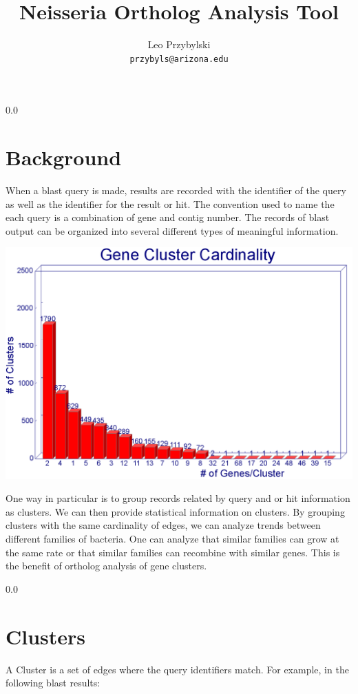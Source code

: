 \documentclass[11pt,notitlepage]{article}
\title{Neisseria Ortholog Analysis Tool}
\author{Leo Przybylski\\
\texttt{przybyls@arizona.edu}}
\begin{document}
  \maketitle
  \tableofcontents

  \abstract{\ldots
}
  {\setlength{\baselineskip}%
           {0.0\baselineskip}
  \section*{\hfill Background}
  \hrulefill \par}
  When a blast query is made, results are recorded with the identifier of the query
  as well as the identifier for the result or hit. The convention used to name the
  each query is a combination of gene and contig number. The records of blast output
  can be organized into several different types of meaningful information.



  \includegraphics[width=145mm]{i90_a90_graph.png}


  One way in particular is to group records related by query and or hit information as
  clusters. We can then provide statistical information on clusters. By grouping clusters
  with the same cardinality of edges, we can analyze trends between different families
  of bacteria. One can analyze that similar families can grow at the same rate or that 
  similar families can recombine with similar genes. This is the benefit of ortholog
  analysis of gene clusters.

  {\setlength{\baselineskip}%
           {0.0\baselineskip}
  \section*{\hfill Clusters}
  \hrulefill \par}
  A Cluster is a set of edges where the query identifiers match. For example, in the
  following blast results:
\end{document}
